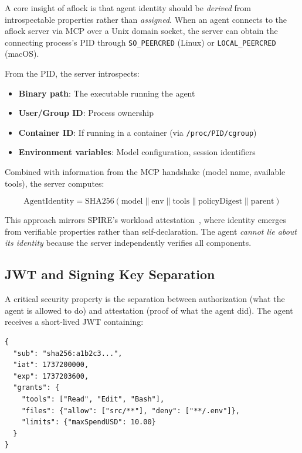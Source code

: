 \documentclass[11pt,a4paper]{article}
\begin{document}
A core insight of aflock is that agent identity should be \textit{derived} from introspectable properties rather than \textit{assigned}. When an agent connects to the aflock server via MCP over a Unix domain socket, the server can obtain the connecting process's PID through \texttt{SO\_PEERCRED} (Linux) or \texttt{LOCAL\_PEERCRED} (macOS).

From the PID, the server introspects:
\begin{itemize}[noitemsep]
    \item \textbf{Binary path}: The executable running the agent
    \item \textbf{User/Group ID}: Process ownership
    \item \textbf{Container ID}: If running in a container (via \texttt{/proc/PID/cgroup})
    \item \textbf{Environment variables}: Model configuration, session identifiers
\end{itemize}

Combined with information from the MCP handshake (model name, available tools), the server computes:

\begin{equation}
\text{AgentIdentity} = \text{SHA256}(\text{model} \| \text{env} \| \text{tools} \| \text{policyDigest} \| \text{parent})
\end{equation}

This approach mirrors SPIRE's workload attestation~\cite{spiffe}, where identity emerges from verifiable properties rather than self-declaration. The agent \textit{cannot lie about its identity} because the server independently verifies all components.

\subsection{JWT and Signing Key Separation}

A critical security property is the separation between authorization (what the agent is allowed to do) and attestation (proof of what the agent did). The agent receives a short-lived JWT containing:

\begin{lstlisting}[style=json]
{
  "sub": "sha256:a1b2c3...",
  "iat": 1737200000,
  "exp": 1737203600,
  "grants": {
    "tools": ["Read", "Edit", "Bash"],
    "files": {"allow": ["src/**"], "deny": ["**/.env"]},
    "limits": {"maxSpendUSD": 10.00}
  }
}
\end{lstlisting}
\end{document}
